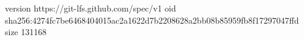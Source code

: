 version https://git-lfs.github.com/spec/v1
oid sha256:4274fc7be6468404015ac2a1622d7b2208628a2bb08b85959fb8f17297047ffd
size 131168
